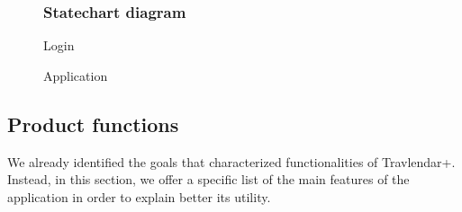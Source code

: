 \documentclass[12pt,titlepage]{article}
\begin{document}
 \pagebreak
 \begin{figure}
\subsubsection{Statechart diagram }\label{sec:mod1}
\centering
{}
\caption{Login}
\par
{}
\caption{Application}
\end{figure}


 
\pagebreak 
\subsection{Product functions}\label{sec:mod1}
We already identified the goals that characterized functionalities of Travlendar+. Instead, in this section, we offer a specific list of the main features of the application in order to explain better its utility. 
\end{document}
